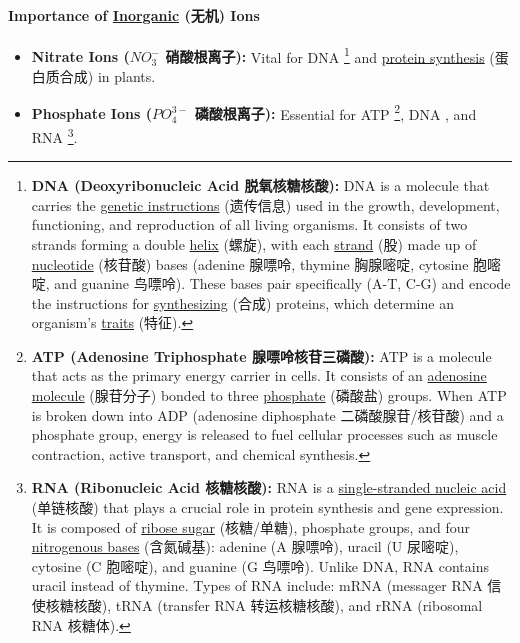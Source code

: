 \paragraph{Importance of \underline{Inorganic} (无机) Ions}
\begin{itemize}
    \item \textbf{Nitrate Ions ($NO_3^-$ 硝酸根离子):} Vital for DNA \footnote{\textbf{DNA (Deoxyribonucleic Acid 脱氧核糖核酸):} DNA
    is a molecule that carries the \underline{genetic instructions} (遗传信息) used in the growth, development, functioning, and
    reproduction of all living organisms. It consists of two strands forming a double \underline{helix} (螺旋), with each
    \underline{strand} (股) made up of \underline{nucleotide} (核苷酸) bases (adenine 腺嘌呤, thymine 胸腺嘧啶, cytosine 胞嘧啶,
    and guanine 鸟嘌呤). These bases pair specifically (A-T, C-G) and encode the instructions for \underline{synthesizing} (合成)
    proteins, which determine an organism's \underline{traits} (特征).} and \underline{protein synthesis} (蛋白质合成) in plants.
    \item \textbf{Phosphate Ions ($PO_4^{3-}$ 磷酸根离子):} Essential for ATP \footnote{\textbf{ATP (Adenosine Triphosphate
    腺嘌呤核苷三磷酸):} ATP is a molecule that acts as the primary energy carrier in cells. It consists of an \underline{adenosine
    molecule} (腺苷分子) bonded to three \underline{phosphate} (磷酸盐) groups. When ATP is broken down into ADP (adenosine
    diphosphate 二磷酸腺苷/核苷酸) and a phosphate group, energy is released to fuel cellular processes such as muscle contraction,
    active transport, and chemical synthesis.}, DNA \footnotemark[3], and RNA \footnote{\textbf{RNA (Ribonucleic Acid 核糖核酸):}
    RNA is a \underline{single-stranded nucleic acid} (单链核酸) that plays a crucial role in protein synthesis and gene
    expression. It is composed of \underline{ribose sugar} (核糖/单糖), phosphate groups, and four \underline{nitrogenous bases}
    (含氮碱基): adenine (A 腺嘌呤), uracil (U 尿嘧啶), cytosine (C 胞嘧啶), and guanine (G 鸟嘌呤). Unlike DNA, RNA contains uracil
    instead of thymine. Types of RNA include: mRNA \footnotemark[6] (messager RNA 信使核糖核酸), tRNA \footnotemark[7] (transfer
    RNA 转运核糖核酸), and rRNA \footnotemark[8] (ribosomal RNA 核糖体).}.
\end{itemize}
